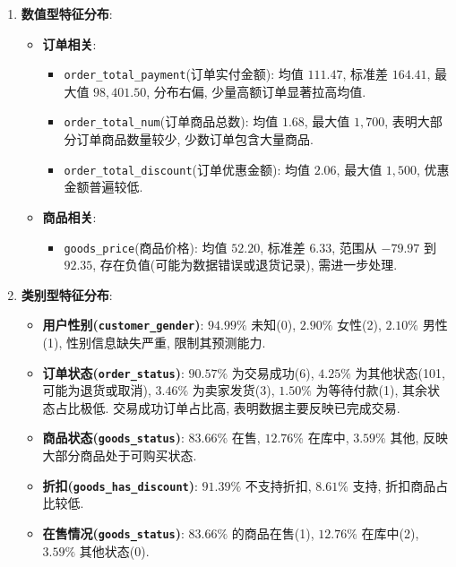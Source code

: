 \documentclass[11pt, a4paper]{article}
\begin{document}
\begin{enumerate}
    \item \textbf{数值型特征分布}:
    \begin{itemize}
        \item \textbf{订单相关}:
        \begin{itemize}
            \item \texttt{order\_total\_payment}(订单实付金额): 均值 $111.47$, 标准差 $164.41$, 最大值 $98,401.50$, 分布右偏, 少量高额订单显著拉高均值.
            \item \texttt{order\_total\_num}(订单商品总数): 均值 $1.68$, 最大值 $1,700$, 表明大部分订单商品数量较少, 少数订单包含大量商品.
            \item \texttt{order\_total\_discount}(订单优惠金额): 均值 $2.06$, 最大值 $1,500$, 优惠金额普遍较低.
        \end{itemize}
        \item \textbf{商品相关}:
        \begin{itemize}
            \item \texttt{goods\_price}(商品价格): 均值 $52.20$, 标准差 $6.33$, 范围从 $-79.97$ 到 $92.35$, 存在负值(可能为数据错误或退货记录), 需进一步处理.
        \end{itemize}
    \end{itemize}

    \item \textbf{类别型特征分布}:
    \begin{itemize}
        \item \textbf{用户性别(\texttt{customer\_gender})}: $94.99\%$ 未知(0), $2.90\%$ 女性(2), $2.10\%$ 男性(1), 性别信息缺失严重, 限制其预测能力.
        \item \textbf{订单状态(\texttt{order\_status})}: $90.57\%$ 为交易成功(6), $4.25\%$ 为其他状态(101, 可能为退货或取消), $3.46\%$ 为卖家发货(3), $1.50\%$ 为等待付款(1), 其余状态占比极低. 交易成功订单占比高, 表明数据主要反映已完成交易.
        \item \textbf{商品状态(\texttt{goods\_status})}: $83.66\%$ 在售, $12.76\%$ 在库中, $3.59\%$ 其他, 反映大部分商品处于可购买状态.
        \item \textbf{折扣(\texttt{goods\_has\_discount})}: $91.39\%$ 不支持折扣, $8.61\%$ 支持, 折扣商品占比较低.
        \item \textbf{在售情况(\texttt{goods\_status})}: $83.66\%$ 的商品在售(1), $12.76\%$ 在库中(2), $3.59\%$ 其他状态(0).
    \end{itemize}


\end{enumerate}
\end{document}
